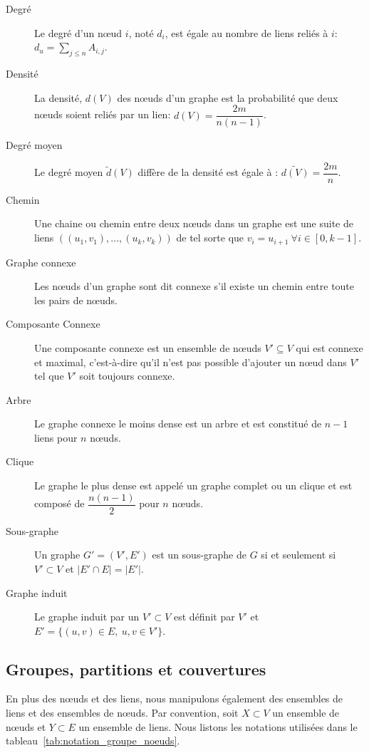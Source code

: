 \begin{description}
\item[Degré] Le degré d'un n\oe ud $i$, noté $d_i$, est égale au nombre de liens reliés à $i$: $d_u = \sum_{j\leq n} A_{i,j}$.
\item[Densité] La densité, $d(V)$ des n\oe uds d'un graphe est la probabilité que deux n\oe uds soient reliés par un lien: $d(V)=\dfrac{2m}{n(n-1)}$.
\item[Degré moyen] Le degré moyen $\tilde{d}(V)$ diffère de la densité est égale à : $\tilde{d(V)}=\dfrac{2m}{n}$.
\item[Chemin] Une chaine ou chemin entre deux n\oe uds dans un graphe est une suite de liens $((u_1,v_1),...,(u_k,v_k))$ de tel sorte que $v_{i}=u_{i+1} \ \forall i \in [0,k-1]$.
\item[Graphe connexe] Les n\oe uds d'un graphe sont dit connexe s'il existe un chemin entre toute les pairs de n\oe uds.
\item[Composante Connexe] Une composante connexe est un ensemble de n\oe uds $V'\subseteq V$ qui est connexe et maximal, c'est-à-dire qu'il n'est pas possible d'ajouter un n\oe ud dans $V'$ tel que $V'$ soit toujours connexe.
\item[Arbre] Le graphe connexe le moins dense est un arbre et est constitué de $n-1$ liens pour $n$ n\oe uds.
\item[Clique] Le graphe le plus dense est appelé un graphe complet ou un clique et est composé de $\dfrac{n(n-1)}{2}$ pour $n$ n\oe uds.
\item[Sous-graphe] Un graphe $G'=(V',E')$ est un sous-graphe de $G$ si et seulement si $V' \subset V$ et $|E'\cap E| = |E'|$.
\item[Graphe induit] Le graphe induit par un $V' \subset V$ est définit par $V'$ et $E'= \{(u,v) \in E,\ u,v \in V'\}$.  
\end{description}



\subsection{Groupes, partitions et couvertures}
En plus des n\oe uds et des liens, nous manipulons également des ensembles de liens et des ensembles de n\oe uds.
Par convention, soit $X \subset V$ un ensemble de n\oe uds et $Y \subset E$ un ensemble de liens.
Nous listons les notations utilisées dans le tableau~\ref{tab:notation_groupe_noeuds}.



